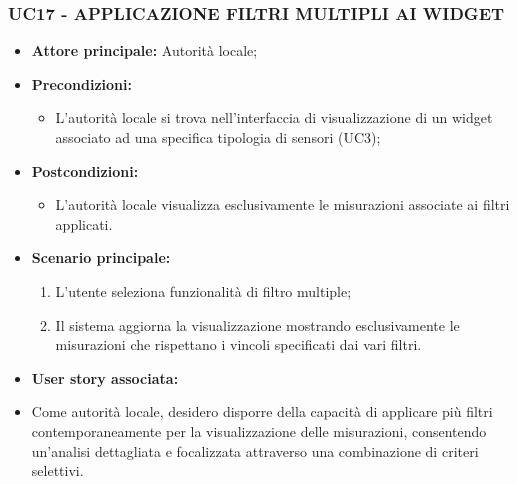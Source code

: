 \subsubsection{UC17 - APPLICAZIONE FILTRI MULTIPLI AI WIDGET}
\begin{itemize}
    \item \textbf{Attore principale:} Autorità locale;
    \item \textbf{Precondizioni:}
        \begin{itemize}
            \item L'autorità locale si trova nell'interfaccia di visualizzazione di un widget associato ad una specifica tipologia di sensori (UC3);
        \end{itemize}
    \item \textbf{Postcondizioni:}
          \begin{itemize}
              \item L'autorità locale visualizza esclusivamente le misurazioni associate ai filtri applicati.
          \end{itemize}
    \item \textbf{Scenario principale:}
          \begin{enumerate}
              \item L'utente seleziona funzionalità di filtro multiple;
              \item Il sistema aggiorna la visualizzazione mostrando esclusivamente le misurazioni che rispettano i vincoli specificati dai vari filtri.
          \end{enumerate}
    \item \textbf{User story associata:} \\
            \item Come autorità locale, desidero disporre della capacità di applicare più filtri contemporaneamente per la visualizzazione delle misurazioni, consentendo un'analisi dettagliata e focalizzata attraverso una combinazione di criteri selettivi.
\end{itemize}
